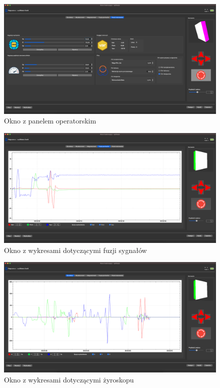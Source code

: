\begin{figure}[h!]
    \centering
    \includegraphics[width=1\textwidth]{Rysunki/Rozdzial06/Panel_sterowania.png}
    \caption{Okno z panelem operatorskim}
    \label{Okno panel}
\end{figure}

\begin{figure}[h!]
    \centering
    \includegraphics[width=1\textwidth]{Rysunki/Rozdzial06/Fuzja.png}
    \caption{Okno z wykresami dotyczącymi fuzji sygnałów}
    \label{Okno fuzja}
\end{figure}

\begin{figure}[h!]
    \centering
    \includegraphics[width=1\textwidth]{Rysunki/Rozdzial06/Zyro.png}
    \caption{Okno z wykresami dotyczącymi żyroskopu}
    \label{Okno zyro}
\end{figure}


